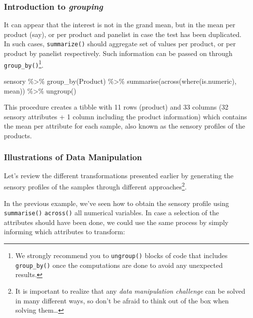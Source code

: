 \documentclass[
]{book}
\newenvironment{Shaded}{\begin{snugshade}}{\end{snugshade}}
\newcommand{\FunctionTok}[1]{\textcolor[rgb]{0.00,0.00,0.00}{#1}}
\newcommand{\NormalTok}[1]{#1}
\newcommand{\SpecialCharTok}[1]{\textcolor[rgb]{0.00,0.00,0.00}{#1}}
\begin{document}
\hypertarget{introduction-to-grouping}{%
\subsubsection{\texorpdfstring{Introduction to \emph{grouping}}{Introduction to grouping}}\label{introduction-to-grouping}}

It can appear that the interest is not in the grand mean, but in the mean per product (say), or per product and panelist in case the test has been duplicated. In such cases, \texttt{summarize()} should aggregate set of values per product, or per product by panelist respectively. Such information can be passed on through \texttt{group\_by()}\footnote{We strongly recommend you to \texttt{ungroup()} blocks of code that includes \texttt{group\_by()} once the computations are done to avoid any unexpected results.}.

\begin{Shaded}
\begin{Highlighting}[]
\NormalTok{sensory }\SpecialCharTok{\%\textgreater{}\%} 
  \FunctionTok{group\_by}\NormalTok{(Product) }\SpecialCharTok{\%\textgreater{}\%} 
  \FunctionTok{summarise}\NormalTok{(}\FunctionTok{across}\NormalTok{(}\FunctionTok{where}\NormalTok{(is.numeric), mean)) }\SpecialCharTok{\%\textgreater{}\%} 
  \FunctionTok{ungroup}\NormalTok{()}
\end{Highlighting}
\end{Shaded}

This procedure creates a tibble with 11 rows (product) and 33 columns (32 sensory attributes + 1 column including the product information) which contains the mean per attribute for each sample, also known as the sensory profiles of the products.

\hypertarget{illustrations-of-data-manipulation}{%
\subsubsection{Illustrations of Data Manipulation}\label{illustrations-of-data-manipulation}}

Let's review the different transformations presented earlier by generating the sensory profiles of the samples through different approaches\footnote{It is important to realize that any \emph{data manipulation challenge} can be solved in many different ways, so don't be afraid to think out of the box when solving them\ldots{}}.

In the previous example, we've seen how to obtain the sensory profile using \texttt{summarise()} \texttt{across()} all numerical variables. In case a selection of the attributes should have been done, we could use the same process by simply informing which attributes to transform:
\end{document}

